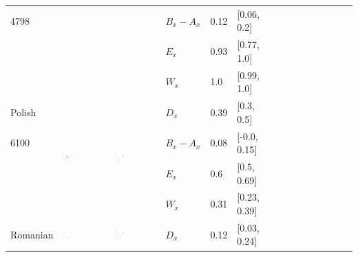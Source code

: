 \documentclass[11pt,letterpaper]{article}
\begin{document}
\begin{longtable}{lllllllllllllll}
4798  &    &    &  $B_x-A_x$  &  0.12  &  [0.06, 0.2]  \\ 
  &    &    &  $E_x$  &  0.93  &  [0.77, 1.0]  \\ 
  &    &    &  $W_x$  &  1.0  &  [0.99, 1.0]  \\ [10.25ex] \hline
Polish  &  \multirow{4}{*}{\includegraphics[width=0.25\textwidth]{figures/Polish-entropy-memory.pdf}}  &  \multirow{4}{*}{\includegraphics[width=0.25\textwidth]{figures/Polish-listener-surprisal-memory.pdf}}  &  $D_x$  &  0.39  &  [0.3, 0.5]  \\ 
6100  &    &    &  $B_x-A_x$  &  0.08  &  [-0.0, 0.15]  \\ 
  &    &    &  $E_x$  &  0.6  &  [0.5, 0.69]  \\ 
  &    &    &  $W_x$  &  0.31  &  [0.23, 0.39]  \\ [10.25ex] \hline
Romanian  &  \multirow{4}{*}{\includegraphics[width=0.25\textwidth]{figures/Romanian-entropy-memory.pdf}}  &  \multirow{4}{*}{\includegraphics[width=0.25\textwidth]{figures/Romanian-listener-surprisal-memory.pdf}}  &  $D_x$  &  0.12  &  [0.03, 0.24]  \\ 

\end{longtable}
\end{document}
